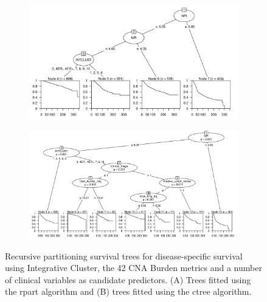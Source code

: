 \begin{figure}[!h]
\centering

\vspace{1cm}

\begin{subfigure}{\textwidth}
\subcaption{}
\includegraphics[width=1\textwidth]{../figures/Chapter_3/Clin_PA_PartyKit_Survival_Burden_DSS_INTCLUST.png}
\end{subfigure}

\vspace{2cm}

\begin{subfigure}{\textwidth}
\subcaption{}
\includegraphics[width=1\textwidth]{../figures/Chapter_3/Clin_PA_Ctree_Survival_Burden_DSS_INTCLUST.png}
\end{subfigure}

\vspace{1cm}

\caption[Recursive partitioning survival trees for disease-specific survival using Integrative Cluster, the 42 CNA Burden metrics and a number of clinical variables as candidate predictors.]{Recursive partitioning survival trees for disease-specific survival using Integrative Cluster, the 42 CNA Burden metrics and a number of clinical variables as candidate predictors. (A) Trees fitted using the rpart algorithm and (B) trees fitted using the ctree algorithm.}
\label{fig:PA_INTCLUST_CNA_Burden_DSS_Clin}
\end{figure}

